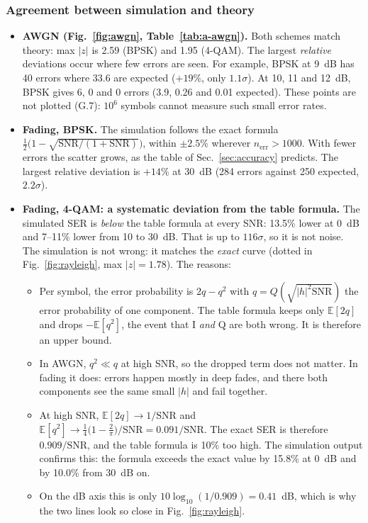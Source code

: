 \documentclass[11pt,a4paper]{article}
\newcommand{\snr}{\mathrm{SNR}}
\newcommand{\E}{\mathbb{E}}
\newcommand{\abs}[1]{\lvert #1 \rvert}
\newcommand{\nerr}{n_{\mathrm{err}}}
\begin{document}
\subsubsection{Agreement between simulation and theory}
\label{sec:p1-agreement}

\begin{itemize}
  \item \textbf{AWGN (Fig.~\ref{fig:awgn}, Table~\ref{tab:a-awgn}).} Both schemes
        match theory: max $\abs{z}$ is 2.59 (BPSK) and 1.95 (4-QAM). The largest
        \emph{relative} deviations occur where few errors are seen. For example, BPSK
        at 9~dB has 40 errors where 33.6 are expected ($+19\%$, only $1.1\sigma$).
        At 10, 11 and 12~dB, BPSK gives 6, 0 and 0 errors (3.9, 0.26 and 0.01
        expected). These points are not plotted (G.7): $10^6$ symbols cannot
        measure such small error rates.
  \item \textbf{Fading, BPSK.} The simulation follows the exact formula
        $\tfrac12\big(1 - \sqrt{\snr/(1+\snr)}\big)$, within $\pm2.5\%$ wherever
        $\nerr > 1000$. With fewer errors the scatter grows, as the table of
        Sec.~\ref{sec:accuracy} predicts. The largest relative deviation is $+14\%$ at 30~dB (284
        errors against 250 expected, $2.2\sigma$).
  \item \textbf{Fading, 4-QAM: a systematic deviation from the table formula.} The
        simulated SER is \emph{below} the table formula at every SNR: 13.5\% lower at
        0~dB and 7--11\% lower from 10 to 30~dB. That is up to $116\sigma$, so it is
        not noise. The simulation is not wrong: it matches the \emph{exact} curve
        (dotted in Fig.~\ref{fig:rayleigh}, max $\abs{z} = 1.78$). The reasons:
        \begin{itemize}
          \item Per symbol, the error probability is $2q - q^2$ with
                $q = Q(\sqrt{\abs{h}^2\snr})$ the error probability of one component.
                The table formula keeps only $\E[2q]$ and drops $-\E[q^2]$, the event
                that I \emph{and} Q are both wrong. It is therefore an upper bound.
          \item In AWGN, $q^2 \ll q$ at high SNR, so the dropped term does not matter.
                In fading it does: errors happen mostly in deep fades, and there both
                components see the same small $\abs{h}$ and fail together.
          \item At high SNR, $\E[2q] \to 1/\snr$ and
                $\E[q^2] \to \tfrac14\big(1 - \tfrac2\pi\big)/\snr = 0.091/\snr$. The
                exact SER is therefore $0.909/\snr$, and the table formula is 10\% too
                high. The simulation output confirms this: the formula exceeds the
                exact value by 15.8\% at 0~dB and by 10.0\% from 30~dB on.
          \item On the dB axis this is only $10\log_{10}(1/0.909) = 0.41$~dB, which is
                why the two lines look so close in Fig.~\ref{fig:rayleigh}.
        \end{itemize}
\end{itemize}
\end{document}
